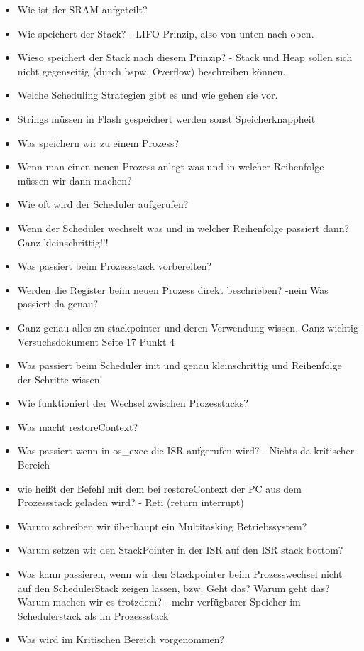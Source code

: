 \documentclass[12pt]{article}
\begin{document}
\begin{itemize}
\item Wie ist der SRAM aufgeteilt?
\item Wie speichert der Stack? - LIFO Prinzip, also von unten nach oben.
\item Wieso speichert der Stack nach diesem Prinzip? - Stack und Heap sollen sich nicht gegenseitig (durch bspw. Overflow) beschreiben können.
\item Welche Scheduling Strategien gibt es und wie gehen sie vor.
\item Strings müssen in Flash gespeichert werden sonst Speicherknappheit
\item Was speichern wir zu einem Prozess?
\item Wenn man einen neuen Prozess anlegt was und in welcher Reihenfolge müssen wir dann machen?
\item Wie oft wird der Scheduler aufgerufen?
\item Wenn der Scheduler wechselt was und in welcher Reihenfolge passiert dann? Ganz kleinschrittig!!!
\item Was passiert beim Prozessstack vorbereiten?
\item Werden die Register beim neuen Prozess direkt beschrieben? -nein Was passiert da genau?
\item Ganz genau alles zu stackpointer und deren Verwendung wissen. Ganz wichtig Versuchsdokument Seite 17 Punkt 4
\item Was passiert beim Scheduler init und genau kleinschrittig und Reihenfolge der Schritte wissen!
\item Wie funktioniert der Wechsel zwischen Prozesstacks?
\item Was macht restoreContext?
\item Was passiert wenn in os\_exec die ISR aufgerufen wird? - Nichts da kritischer Bereich
\item wie heißt der Befehl mit dem bei restoreContext der PC aus dem Prozessstack geladen wird? - Reti (return interrupt)
\item Warum schreiben wir überhaupt ein Multitasking Betriebssystem?
\item Warum setzen wir den StackPointer in der ISR auf den ISR stack bottom?
\item Was kann passieren, wenn wir den Stackpointer beim Prozesswechsel nicht auf den SchedulerStack zeigen lassen, bzw. Geht das? Warum geht das? Warum machen wir es trotzdem? - mehr verfügbarer Speicher im Schedulerstack als im Prozessstack
\item Was wird im Kritischen Bereich vorgenommen?
\end{itemize}
\end{document}
